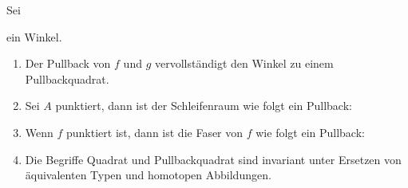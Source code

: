 \begin{bemerkung}
  Sei 
  \begin{center}
  \end{center}
  ein Winkel.
  \begin{enumerate}
  \item Der Pullback von $f$ und $g$ vervollständigt den Winkel zu einem Pullbackquadrat.
  \item Sei $A$ punktiert, dann ist der Schleifenraum wie folgt ein Pullback:
    \begin{center}
    \end{center}
  \item Wenn $f$ punktiert ist, dann ist die Faser von $f$ wie folgt ein Pullback:
    \begin{center}
    \end{center}
  \item Die Begriffe Quadrat und Pullbackquadrat sind invariant unter Ersetzen von äquivalenten Typen und homotopen Abbildungen.
  \end{enumerate}
\end{bemerkung}

